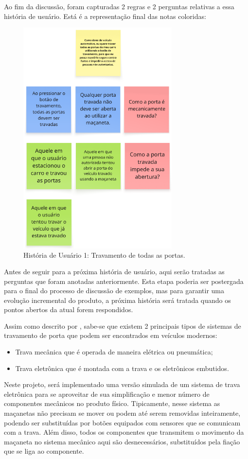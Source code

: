 Ao fim da discussão, foram capturadas 2 regras e 2 perguntas relativas a essa história de usuário. Está é a representação final das notas coloridas:

\begin{figure}[H]
\centering
\includegraphics[height=12cm]{figuras/user_story_1.png}
\caption{História de Usuário 1: Travamento de todas as portas.}
\end{figure}

Antes de seguir para a próxima história de usuário, aqui serão tratadas as perguntas que foram anotadas anteriormente. Esta etapa poderia ser postergada 
para o final do processo de discussão de exemplos, mas para garantir uma evolução incremental do produto, a próxima história será tratada quando os pontos 
abertos da atual forem respondidos.

Assim como descrito por \cite{reif2017locking}, sabe-se que existem 2 principais tipos de sistemas de travamento de porta que podem ser encontrados em veículos modernos:
\begin{itemize}
    \item Trava mecânica que é operada de maneira elétrica ou pneumática;
    \item Trava eletrônica que é montada com a trava e os eletrônicos embutidos.
\end{itemize}

Neste projeto, será implementado uma versão simulada de um sistema de trava eletrônica para se aproveitar de sua simplificação e menor número de componentes 
mecânicos no produto físico. Tipicamente, nesse sistema as maçanetas não precisam se mover ou podem até serem removidas inteiramente, podendo ser substituídas 
por botões equipados com sensores que se comunicam com a trava. Além disso, todos os componentes que transmitem o movimento da maçaneta no sistema mecânico aqui 
são desnecessários, substituídos pela fiação que se liga ao componente.

